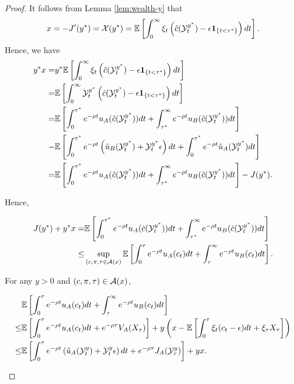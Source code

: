 \documentclass[a4paper,report, 11pt]{article}
\def\e{\epsilon}
\begin{document}
\begin{proof}
	
	It follows from Lemma \ref{lem:wealth-y} that 
	\begin{equation*}
	x=-J'(y^*)={\cal X}(y^*)=\mathbb{E}\left[\int_0^{\infty}{\xi_t}\left(\hat{c}({\cal Y}_t^{y^*})-\e{\bf 1}_{\{t<\tau^*\}}\right)dt\right].
	\end{equation*}
    Hence, we have 
		\begin{eqnarray*}
		\begin{split}
		y^*x=&y^*\mathbb{E}\left[\int_0^{\infty}{\xi_t}\left(\hat{c}({\cal Y}_t^{y^*})-\e{\bf 1}_{\{t<\tau^*\}}\right)dt\right]\\
		=&\mathbb{E}\left[\int_0^{\infty}{\cal Y}_t^{y^*}\left(\hat{c}({\cal Y}_t^{y^*})-\e{\bf 1}_{\{t<\tau^*\}}\right)dt\right]\\
		=&\mathbb{E}\left[\int_0^{\tau^*} e^{-\rho t}u_A(\hat{c}({\cal Y}_t^{y^*}))dt+\int_{\tau^*}^\infty e^{-\rho t}u_B(\hat{c}({\cal Y}_t^{y^*}))dt\right]\\-&\mathbb{E}\left[\int_0^{\tau^*} e^{-\rho t}\left(\tilde{u}_B({\cal Y}_t^{y^*} )+{\cal Y}_t^{y^*}\e\right)dt+\int_0^{\tau^*} e^{-\rho t}\tilde{u}_A({\cal Y}_t^{y^*} )dt\right]\\
		=&\mathbb{E}\left[\int_0^{\tau^*} e^{-\rho t}u_A(\hat{c}({\cal Y}_t^{y^*}))dt+\int_{\tau^*}^\infty e^{-\rho t}u_B(\hat{c}({\cal Y}_t^{y^*}))dt\right]-J(y^*).
		\end{split}
		\end{eqnarray*}
	
	Hence,
	\begin{footnotesize}
		\begin{align*}
		J(y^*) +y^*x=&\mathbb{E}\left[\int_0^{\tau^*} e^{-\rho t}u_A(\hat{c}({\cal Y}_t^{y^*}))dt+\int_{\tau^*}^\infty e^{-\rho t}u_B(\hat{c}({\cal Y}_t^{y^*}))dt\right]\\
		\le &\sup_{(c,\pi,\tau\in{\cal A}(x)} \mathbb{E}\left[\int_0^\tau e^{-\rho t} u_A(c_t)dt+\int_\tau^\infty e^{-\rho t}u_B(c_t)dt\right]. 
		\end{align*}
	\end{footnotesize}
	
	For any $y>0$ and $(c,\pi,\tau)\in {\cal A}(x)$,  
	\begin{footnotesize}
		\begin{align*}
		&\mathbb{E}\left[\int_0^\tau e^{-\rho t} u_A(c_t)dt+\int_\tau^\infty e^{-\rho t}u_B(c_t)dt\right]\\
		\le&\mathbb{E}\left[\int_0^\tau e^{-\rho t} u_A(c_t)dt+e^{-\rho \tau}V_A(X_\tau)\right]+y\left(x-\mathbb{E}\left[\int_0^\tau {\xi_t} (c_t - \e)dt + \xi_{\tau}X_{\tau} \right]\right)\\
		\le&\mathbb{E}\left[\int_0^\tau e^{-\rho t}\left(\tilde{u}_A({\cal Y}_t^y)+{\cal Y}_t^y \e\right)dt +e^{-\rho \tau}J_A({\cal Y}_{\tau}^y)\right]+yx. 
		\end{align*}
	\end{footnotesize}
	

\end{proof}
\end{document}
